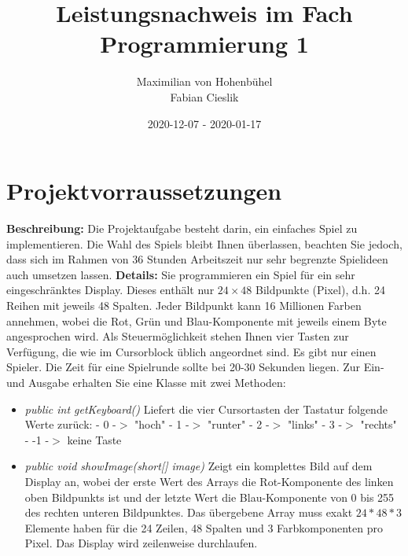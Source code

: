 \documentclass{article}
\title{Leistungsnachweis im Fach Programmierung 1}
\date{2020-12-07 - 2020-01-17}
\author{Maximilian von Hohenbühel \\ Fabian Cieslik}
\begin{document}
\maketitle
\newpage
\tableofcontents %
\newpage

\section{Projektvorraussetzungen}
\textbf{Beschreibung:} Die Projektaufgabe besteht darin, ein einfaches Spiel zu implementieren. Die Wahl des Spiels bleibt Ihnen überlassen, beachten Sie jedoch, dass sich im Rahmen von 36 Stunden Arbeitszeit nur sehr begrenzte Spielideen auch umsetzen lassen.
\newline
\textbf{Details:} Sie programmieren ein Spiel für ein sehr eingeschränktes Display. Dieses enthält nur $24\times 48$ Bildpunkte (Pixel), d.h. 24 Reihen mit jeweils 48 Spalten. Jeder Bildpunkt kann 16 Millionen Farben annehmen, wobei die Rot, Grün und Blau-Komponente mit jeweils einem Byte angesprochen wird. Als Steuermöglichkeit stehen Ihnen vier Tasten zur Verfügung, die wie im Cursorblock üblich angeordnet sind. Es gibt nur einen Spieler. Die Zeit für eine Spielrunde sollte bei 20-30 Sekunden liegen.
\newline
Zur Ein- und Ausgabe erhalten Sie eine Klasse mit zwei Methoden:
\begin{itemize}
    \item \textit{public int getKeyboard()}
        \newline
        Liefert die vier Cursortasten der Tastatur folgende Werte zurück:
        \newline - 0 -$>$ "hoch"
        \newline - 1 -$>$ "runter"
        \newline - 2 -$>$ "links"
        \newline - 3 -$>$ "rechts"
        \newline - -1 -$>$ keine Taste
    \item \textit{public void showImage(short[] image)}
        \newline
        Zeigt ein komplettes Bild auf dem Display an, wobei der erste Wert des Arrays die Rot-Komponente des linken oben Bildpunkts ist und der letzte Wert die Blau-Komponente von 0 bis 255 des rechten unteren Bildpunktes. Das übergebene Array muss exakt $24*48*3$ Elemente haben für die 24 Zeilen, 48 Spalten und 3 Farbkomponenten pro Pixel. Das Display wird zeilenweise durchlaufen.
\end{itemize}
\end{document}
